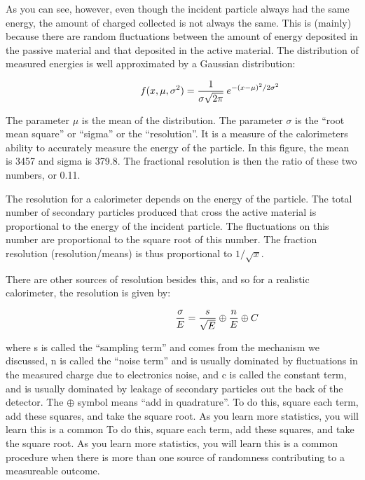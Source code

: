 \;
\noindent
As you can see, however, even though the incident particle always had the same energy, the amount of charged collected is not always the same. This is (mainly) because there are random fluctuations between the amount of energy deposited in the passive material and that deposited in the active material. The distribution of measured energies is well approximated by a Gaussian distribution:

\begin{equation}\hspace{20 mm}f(x,\mu,\sigma^{2}) = \frac{1}{\sigma\sqrt{2\pi }}\: e^{-(x-\mu)^{2}/2\sigma^{2}}\end{equation}

\;
\;

\noindent
The parameter $\mu$ is the mean of the distribution. The parameter $\sigma$ is the ``root mean square'' or ``sigma'' or the ``resolution''. It is a measure of the calorimeters ability to accurately measure the energy of the particle. In this figure, the mean is 3457 and sigma is 379.8. The fractional resolution is then the ratio of these two numbers, or 0.11.

\;
\noindent
The resolution for a calorimeter depends on the energy of the particle. The total number of secondary particles produced that cross the active material is proportional to the energy of the incident particle. The fluctuations on this number are proportional to the square root of this number. The fraction resolution (resolution/means) is thus proportional to $1/\sqrt{x}$.

\;
\noindent
There are other sources of resolution besides this, and so for a realistic calorimeter, the resolution is given by:

\begin{equation}\hspace{25 mm}\frac{\sigma }{E} = \frac{s}{\sqrt{E}} \oplus \frac{n}{E} \oplus C
\end{equation}

\;
\;

where s is called the ``sampling term'' and comes from the mechanism we discussed, n is called the ``noise term'' and is usually dominated by fluctuations in the measured charge due to electronics noise, and c is called the constant term, and is usually dominated by leakage of secondary particles out the back of the detector. The $\oplus$ symbol means ``add in quadrature''. To do this, square each term, add these squares, and take the square root.  As you learn more statistics, you will learn this is a common To do this, square each term, add these squares, and take the square root.  As you learn more statistics, you will learn this is a common procedure when there is more than one source of randomness contributing to a measureable outcome.

